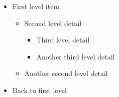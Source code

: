 \begin{itemize}
    \item First level item
    \begin{itemize}
        \item Second level detail
        \begin{itemize}
            \item Third level detail
            \item Another third level detail
        \end{itemize}
        \item Another second level detail
    \end{itemize}
    \item Back to first level
\end{itemize}
